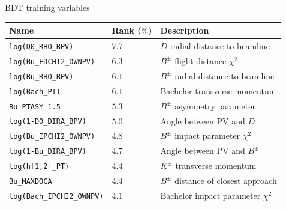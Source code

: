 \documentclass{beamer}
\begin{document}
\begin{frame}{BDT training variables}
  \centering
  \begin{tabular}{|l|l|l|}
    \hline
    Name & Rank ($\%$) & Description \\
    \hline
    \texttt{log(D0\_RHO\_BPV)} & $7.7$ & $D$ radial distance to beamline \\
    \texttt{log(Bu\_FDCHI2\_OWNPV)} & $6.3$ & $B^\pm$ flight distance $\chi^2$ \\
    \texttt{log(Bu\_RHO\_BPV)} & $6.1$ & $B^\pm$ radial distance to beamline \\
    \texttt{log(Bach\_PT)} & $6.1$ & Bachelor transverse momentum \\
    \texttt{Bu\_PTASY\_1.5} & $5.3$ & $B^\pm$ asymmetry parameter \\
    \texttt{log(1-D0\_DIRA\_BPV)} & $5.0$ & Angle between PV and $D$ \\
    \texttt{log(Bu\_IPCHI2\_OWNPV)} & $4.8$ & $B^\pm$ impact parameter $\chi^2$ \\
    \texttt{log(1-Bu\_DIRA\_BPV)} & $4.7$ & Angle between PV and $B^\pm$ \\
    \texttt{log(h[1,2]\_PT)} & $4.4$ & $K^\pm$ transverse momentum \\
    \texttt{Bu\_MAXDOCA} & $4.4$ & $B^\pm$ distance of closest approach \\
    \texttt{log(Bach\_IPCHI2\_OWNPV)} & $4.1$ & Bachelor impact parameter $\chi^2$ \\
    \hline
  \end{tabular}
\end{frame}
\end{document}
